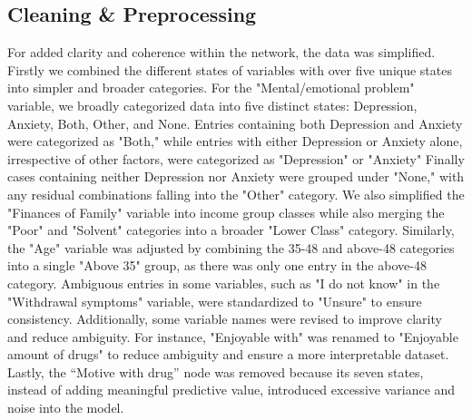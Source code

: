 \documentclass[conference]{IEEEtran}
\begin{document}
\subsection{Cleaning \& Preprocessing}
For added clarity and coherence within the network, the data was simplified. Firstly we combined the different states of variables with over five unique states into simpler and broader categories. For the "Mental/emotional problem" variable, we broadly categorized data into five distinct states: Depression, Anxiety, Both, Other, and None. Entries containing both Depression and Anxiety were categorized as "Both," while entries with either Depression or Anxiety alone, irrespective of other factors, were categorized as "Depression" or "Anxiety" Finally cases containing neither Depression nor Anxiety were grouped under "None," with any residual combinations falling into the "Other" category. We also simplified the "Finances of Family" variable into income group classes while also merging the "Poor" and "Solvent" categories into a broader "Lower Class" category. Similarly, the "Age" variable was adjusted by combining the 35-48 and above-48 categories into a single "Above 35" group, as there was only one entry in the above-48 category. Ambiguous entries in some variables, such as "I do not know" in the "Withdrawal symptoms" variable, were standardized to "Unsure" to ensure consistency. Additionally, some variable names were revised to improve clarity and reduce ambiguity. For instance, "Enjoyable with" was renamed to "Enjoyable amount of drugs" to reduce ambiguity and ensure a more interpretable dataset. Lastly, the “Motive with drug” node was removed because its seven states, instead of adding meaningful predictive value, introduced excessive variance and noise into the model.
\end{document}
